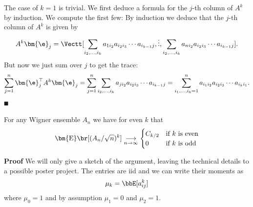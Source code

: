 The case of $k = 1$ is trivial. We first deduce a formula for the $j$-th column of $A^k$ by induction. We compute the first few:
By induction we deduce that the $j$-th column of $A^k$ is given by
\[
A^k \ensuremath{\bm{\e}}_j = \Vectt[\ensuremath{\sum}_{i_2,\ensuremath{\ldots},i_k} a_{1 i_2} a_{i_2 i_3} \ensuremath{\cdots} a_{i_{k-1} j}, \ensuremath{\vdots}, \ensuremath{\sum}_{i_2,\ensuremath{\ldots},i_k} a_{n i_2} a_{i_2 i_3} \ensuremath{\cdots} a_{i_{k-1} j}].
\]
But now we just sum over $j$ to get the trace:
\[
\ensuremath{\sum}_{j=1}^n \ensuremath{\bm{\e}}_j^\ensuremath{\top} A^k \ensuremath{\bm{\e}}_j = \ensuremath{\sum}_{j=1}^n \ensuremath{\sum}_{i_2,\ensuremath{\ldots},i_k} a_{j i_2} a_{i_2 i_3} \ensuremath{\cdots} a_{i_{k-1} j} = \ensuremath{\sum}_{i_1,\ensuremath{\ldots},i_k = 1}^n a_{i_1 i_2} a_{i_2 i_3} \ensuremath{\cdots} a_{i_k i_1}.
\]
\ensuremath{\QED}

\begin{theorem} For any Wigner ensemble $A_n$ we have for even $k$ that
\[
  \ensuremath{\bm{\mathrm{E}}}\br[(A_n/\sqrt{n})^k] \underset{n \ensuremath{\rightarrow} \ensuremath{\infty}}{\ensuremath{\longrightarrow}} \begin{cases}
    C_{k/2} & \hbox{\textrm{if $k$ is even}} \\
    0 & \hbox{\textrm{if $k$ is odd}}
  \end{cases}
\]
\end{theorem}
\textbf{Proof} We will only give a sketch of the argument, leaving the technical details to a possible poster project. The entries  are iid and we can write their moments as
\[
\ensuremath{\mu}_k = \ensuremath{\bbE}[a_{ij}^k]
\]
where $\ensuremath{\mu}_0 = 1$ and by assumption $\ensuremath{\mu}_1 = 0$ and $\ensuremath{\mu}_2 = 1$.

